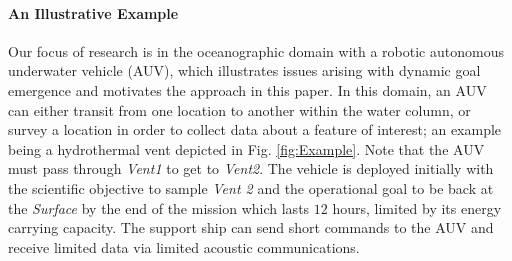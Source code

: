 \paragraph{An Illustrative Example} 

Our focus of research is in the oceanographic domain with a robotic
autonomous underwater vehicle (AUV), which illustrates issues arising
with dynamic goal emergence and motivates the approach in this paper.
In this domain, an AUV can either transit from one location to another
within the water column, or survey a location in order to collect data
about a feature of interest; an example being a hydrothermal vent
depicted in Fig. \ref{fig:Example}.  Note that the AUV must pass
through {\em Vent1} to get to {\em Vent2}.  The vehicle is deployed
initially with the scientific objective to sample {\em Vent 2} and the
operational goal to be back at the {\em Surface} by the end of the
mission which lasts $12$ hours, limited by its energy carrying
capacity. The support ship can send short commands to the AUV and
receive limited data via limited acoustic communications.

